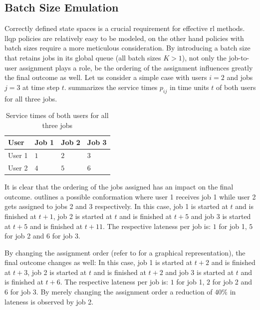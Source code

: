 \documentclass{seal_thesis}
\begin{document}
\subsection{Batch Size Emulation}
\label{subsec:batch_size_emulation}

Correctly defined state spaces is a crucial requirement for effective \gls{rl} methods. \gls{llqp} policies are relatively easy to be modeled, on the other hand policies with batch sizes require a more meticulous consideration. By introducing a batch size that retains jobs in its global queue (\ie all batch sizes $K>1$), not only the job-to-user assignment plays a role, be the ordering of the assignment influences greatly the final outcome as well. Let us consider a simple case with users $i=2$ and jobs $j=3$ at time step $t$.  summarizes the service times $p_{ij}$ in time units $t$ of both users for all three jobs.

\begin{table}[!ht]
\centering
\begin{tabular}{@{}llll@{}}
\toprule
User   & Job 1 & Job 2 & Job 3 \\ \midrule
User 1 & $1$     & $2$     & $3$     \\
User 2 & $4$     & $5$     & $6$     \\ \bottomrule
\end{tabular}
\caption{Service times of both users for all three jobs}
\label{tab:users_service_times_example}
\end{table}

It is clear that the ordering of the jobs assigned has an impact on the final outcome.  outlines a possible conformation where user 1 receives job 1 while user 2 gets assigned to jobs 2 and 3 respectively. In this case, job 1 is started at $t$ and is finished at $t+1$, job 2 is started at $t$ and is finished at $t+5$ and job 3 is started at $t+5$ and is finished at $t+11$. The respective lateness per job is: $1$ for job 1, $5$ for job 2 and $6$ for job $3$.

By changing the assignment order (refer to  for a graphical representation), the final outcome changes as well: In this case, job 1 is started at $t+2$ and is finished at $t+3$, job 2 is started at $t$ and is finished at $t+2$ and job 3 is started at $t$ and is finished at $t+6$. The respective lateness per job is: $1$ for job 1, $2$ for job 2 and $6$ for job $3$. By merely changing the assignment order a reduction of $40\%$ in lateness is observed by job 2.
\end{document}
